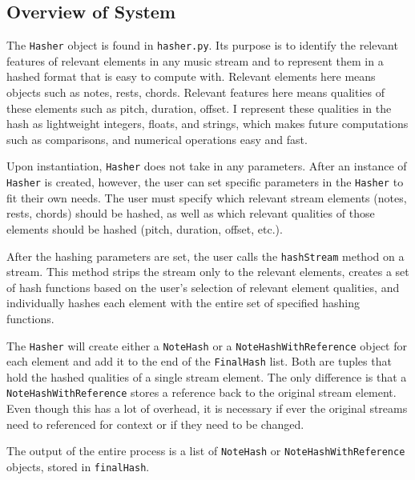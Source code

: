\subsection{Overview of System}
The \texttt{Hasher} object is found in \texttt{hasher.py}. Its purpose is to identify the relevant features of relevant elements in any music stream and to represent them in a hashed format that is easy to compute with. Relevant elements here means objects such as notes, rests, chords. Relevant features here means qualities of these elements such as pitch, duration, offset. I represent these qualities in the hash as lightweight integers, floats, and strings, which makes future computations such as comparisons, and numerical operations easy and fast. 

Upon instantiation, \texttt{Hasher} does not take in any parameters. After an instance of \texttt{Hasher} is created, however, the user can set specific parameters in the \texttt{Hasher} to fit their own needs. The user must specify which relevant stream elements (notes, rests, chords) should be hashed, as well as which relevant qualities of those elements should be hashed (pitch, duration, offset, etc.). 

After the hashing parameters are set, the user calls the \texttt{hashStream} method on a stream. This method strips the stream only to the relevant elements, creates a set of hash functions based on the user's selection of relevant element qualities, and individually hashes each element with the entire set of specified hashing functions. 

The \texttt{Hasher} will create either a \texttt{NoteHash} or a \texttt{NoteHashWithReference} object for each element and add it to the end of the \texttt{FinalHash} list. Both are tuples that hold the hashed qualities of a single stream element. The only difference is that a \texttt{NoteHashWithReference} stores a reference back to the original stream element. Even though this has a lot of overhead, it is necessary if ever the original streams need to referenced for context or if they need to be changed.

The output of the entire process is a list of  \texttt{NoteHash} or \texttt{NoteHashWithReference} objects, stored in \texttt{finalHash}.

